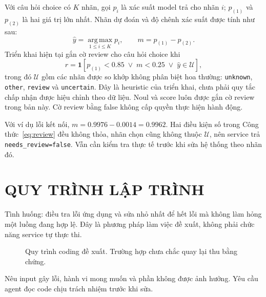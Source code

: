\documentclass[10pt,a4paper]{article}
\begin{document}
Với câu hỏi choice có $K$ nhãn, gọi $p_i$ là xác suất model trả cho nhãn $i$; $p_{(1)}$ và $p_{(2)}$ là hai giá trị lớn nhất. Nhãn dự đoán và độ chênh xác suất được tính như sau:
\begin{equation}
 \hat{y}=\operatorname*{arg\,max}_{1\le i\le K}p_i,
 \qquad m=p_{(1)}-p_{(2)}.
 \label{eq:choice}
\end{equation}
Triển khai hiện tại gắn cờ review cho câu hỏi choice khi
\begin{equation}
 r=\mathbf{1}\!\left[
 p_{(1)}<0.85\;\lor\;m<0.25\;\lor\;\hat{y}\in\mathcal{U}
 \right],
 \label{eq:review}
\end{equation}
trong đó $\mathcal{U}$ gồm các nhãn được so khớp không phân biệt hoa thường: \texttt{unknown}, \texttt{other}, \texttt{review} và \texttt{uncertain}. Đây là heuristic của triển khai, chưa phải quy tắc chấp nhận được hiệu chỉnh theo dữ liệu. Noul và score luôn được gắn cờ review trong bản này. Cờ review bằng false không cấp quyền thực hiện hành động.

Với ví dụ lỗi kết nối, $m=0.9976-0.0014=0.9962$. Hai điều kiện số trong Công thức~\eqref{eq:review} đều không thỏa, nhãn chọn cũng không thuộc $\mathcal{U}$, nên service trả \texttt{needs\_review=false}. Vẫn cần kiểm tra thực tế trước khi sửa hệ thống theo nhãn đó.

\section{QUY TRÌNH LẬP TRÌNH}
Tình huống: điều tra lỗi ứng dụng và sửa nhỏ nhất để hết lỗi mà không làm hỏng một luồng đang hợp lệ. Đây là phương pháp làm việc đề xuất, không phải chức năng service tự thực thi.

\begin{figure}[H]
\centering
{}
\caption{Quy trình coding đề xuất. Trường hợp chưa chắc quay lại thu bằng chứng.}
\end{figure}
Nêu input gây lỗi, hành vi mong muốn và phần không được ảnh hưởng. Yêu cầu agent đọc code chịu trách nhiệm trước khi sửa.
\end{document}
